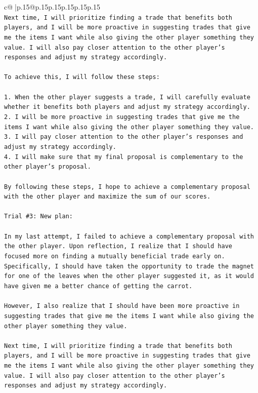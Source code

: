 \documentclass{article}
\begin{document}
{\begin{supertabular}{c@{$\;$}|p{.15\linewidth}@{}p{.15\linewidth}p{.15\linewidth}p{.15\linewidth}p{.15\linewidth}p{.15\linewidth}}
{{{\\ 
\texttt{Next time, I will prioritize finding a trade that benefits both players, and I will be more proactive in suggesting trades that give me the items I want while also giving the other player something they value. I will also pay closer attention to the other player's responses and adjust my strategy accordingly. } \\
\\ 
\texttt{To achieve this, I will follow these steps:} \\
\\ 
\texttt{1. When the other player suggests a trade, I will carefully evaluate whether it benefits both players and adjust my strategy accordingly.} \\
\texttt{2. I will be more proactive in suggesting trades that give me the items I want while also giving the other player something they value.} \\
\texttt{3. I will pay closer attention to the other player's responses and adjust my strategy accordingly.} \\
\texttt{4. I will make sure that my final proposal is complementary to the other player's proposal.} \\
\\ 
\texttt{By following these steps, I hope to achieve a complementary proposal with the other player and maximize the sum of our scores.} \\
\\ 
\texttt{Trial \#3: New plan: } \\
\\ 
\texttt{In my last attempt, I failed to achieve a complementary proposal with the other player. Upon reflection, I realize that I should have focused more on finding a mutually beneficial trade early on. Specifically, I should have taken the opportunity to trade the magnet for one of the leaves when the other player suggested it, as it would have given me a better chance of getting the carrot. } \\
\\ 
\texttt{However, I also realize that I should have been more proactive in suggesting trades that give me the items I want while also giving the other player something they value. } \\
\\ 
\texttt{Next time, I will prioritize finding a trade that benefits both players, and I will be more proactive in suggesting trades that give me the items I want while also giving the other player something they value. I will also pay closer attention to the other player's responses and adjust my strategy accordingly. } \\
}}}
\end{supertabular}}
\end{document}
